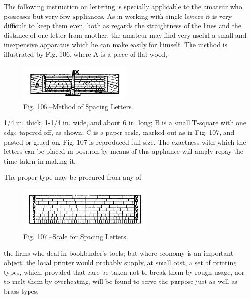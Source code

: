 \documentclass[twoside]{book}
\begin{document}
The following instruction on lettering is specially
\pagebreak
applicable to the amateur who possesses but very
few appliances. As in working with single letters it
is very difficult to keep them even, both as regards
the straightness of the lines and the distance of one
letter from another, the amateur may find very
useful a small and inexpensive apparatus which he
can make easily for himself. The method is illustrated
by Fig. 106, where A is a piece of flat wood,
	\begin{figure}[h]
		\centering
		\includegraphics[width=0.5\textwidth]{Figures/_106.png}
		\caption*{Fig. 106.--Method of Spacing Letters.}
	\end{figure}
1/4 in. thick, 1-1/4 in. wide, and about 6 in. long;
B is a small T-square with one edge tapered off, as
shown; C is a paper scale, marked out as in Fig. 107,
and pasted or glued on. Fig. 107 is reproduced full
size. The exactness with which the letters can be
placed in position by means of this appliance will
amply repay the time taken in making it.

The proper type may be procured from any of
	\begin{figure}[h]
		\centering
		\includegraphics[width=0.6\textwidth]{Figures/_107.png}
		\caption*{Fig. 107.--Scale for Spacing Letters.}
	\end{figure}
the firms who deal in bookbinder's tools; but where
economy is an important object, the local printer
would probably supply, at small cost, a set of printing
types, which, provided that care be taken not to
break them by rough usage, nor to melt them by
overheating, will be found to serve the purpose just
as well as brass types.
\end{document}
